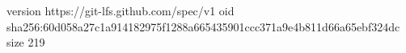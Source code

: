 version https://git-lfs.github.com/spec/v1
oid sha256:60d058a27c1a914182975f1288a665435901ccc371a9e4b811d66a65ebf324dc
size 219

